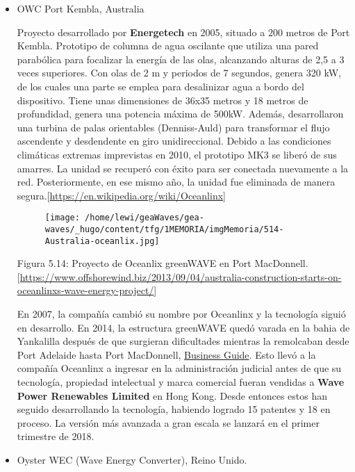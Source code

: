 \begin{itemize}
\item
  OWC Port Kembla, Australia

  Proyecto desarrollado por \textbf{Energetech} en 2005, situado a 200
  metros de Port Kembla. Prototipo de columna de agua oscilante que
  utiliza una pared parabólica para focalizar la energía de las olas,
  alcanzando alturas de 2,5 a 3 veces superiores. Con olas de 2 m y
  periodos de 7 segundos, genera 320 kW, de los cuales una parte se
  emplea para desalinizar agua a bordo del dispositivo. Tiene unas
  dimensiones de 36x35 metros y 18 metros de profundidad, genera una
  potencia máxima de 500kW. Además, desarrollaron una turbina de palas
  orientables (Denniss-Auld) para transformar el flujo ascendente y
  desdendente en giro unidireccional. Debido a las condiciones
  climáticas extremas imprevistas en 2010, el prototipo MK3 se liberó de
  sus amarres. La unidad se recuperó con éxito para ser conectada
  nuevamente a la red. Posteriormente, en ese mismo año, la unidad fue
  eliminada de manera
  segura.{[}\url{https://en.wikipedia.org/wiki/Oceanlinx}{]}

  \begin{figure}
  \centering
  \texttt{[image: /home/lewi/geaWaves/gea-waves/\_hugo/content/tfg/1MEMORIA/imgMemoria/514-Australia-oceanlix.jpg]}
  \caption{}
  \end{figure}

  Figura 5.14: Proyecto de Oceanlix greenWAVE en Port MacDonnell.
  {[}\url{https://www.offshorewind.biz/2013/09/04/australia-construction-starts-on-oceanlinxs-wave-energy-project/}{]}

  En 2007, la compañía cambió su nombre por Oceanlinx y la tecnología
  siguió en desarrollo. En 2014, la estructura greenWAVE quedó varada en
  la bahia de Yankalilla después de que surgieran dificultades mientras
  la remolcaban desde Port Adelaide hasta Port MacDonnell,
  \href{https://www.offshorewind.biz/2015/04/14/greenwave-still-stranded-off-south-australia/}{Business
  Guide}. Esto llevó a la compañía Oceanlinx a ingresar en la
  administración judicial antes de que su tecnología, propiedad
  intelectual y marca comercial fueran vendidas a \textbf{Wave Power
  Renewables Limited} en Hong Kong. Desde entonces estos han seguido
  desarrollando la tecnología, habiendo logrado 15 patentes y 18 en
  proceso. La versión más avanzada a gran escala se lanzará en el primer
  trimestre de 2018.\\
\item
  Oyster WEC (Wave Energy Converter), Reino Unido.


\end{itemize}
